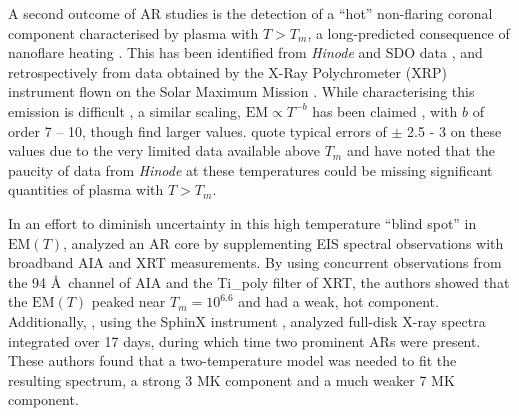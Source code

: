 \documentclass[iop]{emulateapj}
\newcommand{\ang}{\AA~}
\begin{document}
%
	\par A second outcome of AR studies is the detection of a ``hot'' non-flaring coronal component characterised by plasma with $T > T_m$, a long-predicted consequence of nanoflare heating \citep{cargill_implications_1994,cargill_diagnostics_1995}. This has been identified from \textit{Hinode} and SDO data \citep{reale_evidence_2009,schmelz_hinode_2009,testa_hinode/eis_2012}, and retrospectively from data obtained by the X-Ray Polychrometer (XRP) instrument flown on the Solar Maximum Mission \citep{del_zanna_elemental_2014}. While characterising this emission is difficult \citep[e.g.][]{testa_temperature_2011,winebarger_defining_2012}, a similar scaling, $\mathrm{EM} \propto T^{-b}$ has been claimed \citep[e.g.][]{warren_systematic_2012}, with $b$ of order 7 – 10, though \citeauthor{del_zanna_elemental_2014} find larger values. \citeauthor{warren_systematic_2012} quote typical errors of $\pm$ 2.5 - 3 on these values due to the very limited data available above $T_m$ and \citeauthor{winebarger_defining_2012} have noted that the paucity of data from \textit{Hinode} at these temperatures could be missing significant quantities of plasma with $T > T_m$.
	\par In an effort to diminish uncertainty in this high temperature ``blind spot'' in $\mathrm{EM}(T)$, \citet{petralia_thermal_2014} analyzed an AR core by supplementing EIS spectral observations with broadband AIA and XRT measurements. By using concurrent observations from the 94 \ang channel of AIA and the Ti\_poly filter of XRT, the authors showed that the $\mathrm{EM}(T)$ peaked near $T_m = 10^{6.6}$ and had a weak, hot component. Additionally, \citet{miceli_x-ray_2012}, using the SphinX instrument \citep{sylwester_sphinx:_2008,gburek_sphinx_2011}, analyzed full-disk X-ray spectra integrated over 17 days, during which time two prominent ARs were present. These authors found that a two-temperature model was needed to fit the resulting spectrum, a strong 3 MK component and a much weaker 7 MK component.
%
\end{document}
